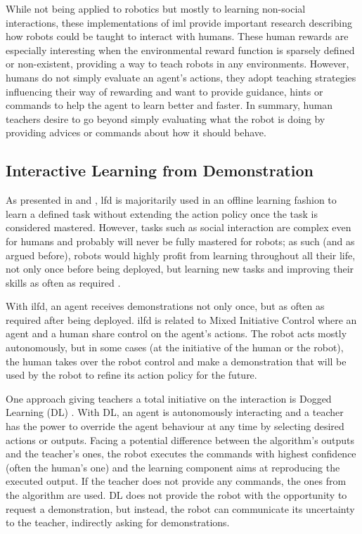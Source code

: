 While not being applied to robotics but mostly to learning non-social interactions, these implementations of \gls{iml} provide important research describing how robots could be taught to interact with humans. These human rewards are especially interesting when the environmental reward function is sparsely defined or non-existent, providing a way to teach robots in any environments. However, humans do not simply evaluate an agent's actions, they adopt teaching strategies influencing their way of rewarding and want to provide guidance, hints or commands to help the agent to learn better and faster. In summary, human teachers desire to go beyond simply evaluating what the robot is doing by providing advices or commands about how it should behave.


\subsection{Interactive Learning from Demonstration} \label{ssec:back_ilfd}

As presented in \cite{argall2009survey} and \cite{billard2008robot}, \gls{lfd} is majoritarily used in an offline learning fashion to learn a defined task without extending the action policy once the task is considered mastered. However, tasks such as social interaction are complex even for humans and probably will never be fully mastered for robots; as such (and as argued before), robots would highly profit from learning throughout all their life, not only once before being deployed, but learning new tasks and improving their skills as often as required \citep{dautenhahn2004robots}.

With \gls{ilfd}, an agent receives demonstrations not only once, but as often as required after being deployed. \gls{ilfd} is related to Mixed Initiative Control \citep{adams2004mixed} where an agent and a human share control on the agent's actions. The robot acts mostly autonomously, but in some cases (at the initiative of the human or the robot), the human takes over the robot control and make a demonstration that will be used by the robot to refine its action policy for the future.

One approach giving teachers a total initiative on the interaction is Dogged Learning (DL) \citep{grollman2007dogged}. With DL, an agent is autonomously interacting and a teacher has the power to override the agent behaviour at any time by selecting desired actions or outputs. Facing a potential difference between the algorithm's outputs and the teacher's ones, the robot executes the commands with highest confidence (often the human's one) and the learning component aims at reproducing the executed output. If the teacher does not provide any commands, the ones from the algorithm are used. DL does not provide the robot with the opportunity to request a demonstration, but instead, the robot can communicate its uncertainty to the teacher, indirectly asking for demonstrations. 

